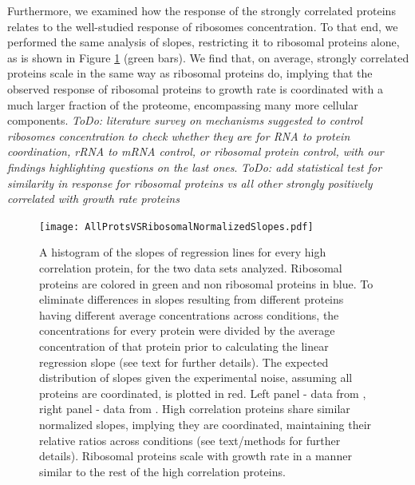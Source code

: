 \documentclass[notitlepage]{article}
\begin{document}
Furthermore, we examined how the response of the strongly correlated proteins relates to the well-studied response of ribosomes concentration.
To that end, we performed the same analysis of slopes, restricting it to ribosomal proteins alone, as is shown in Figure \ref{fig:globalfit} (green bars).
We find that, on average, strongly correlated proteins scale in the same way as ribosomal proteins do, implying that the observed response of ribosomal proteins to growth rate is coordinated with a much larger fraction of the proteome, encompassing many more cellular components.
\emph{ToDo: literature survey on mechanisms suggested to control ribosomes concentration to check whether they are for RNA to protein coordination, rRNA to mRNA control, or ribosomal protein control, with our findings highlighting questions on the last ones}.
\emph{ToDo: add statistical test for similarity in response for ribosomal proteins vs all other strongly positively correlated with growth rate proteins}

\begin{figure}[h]
\centering
\texttt{[image: AllProtsVSRibosomalNormalizedSlopes.pdf]}
\caption{
    A histogram of the slopes of regression lines for every high correlation protein, for the two data sets analyzed.
    Ribosomal proteins are colored in green and non ribosomal proteins in blue.
    To eliminate differences in slopes resulting from different proteins having different average concentrations across conditions, the concentrations for every protein were divided by the average concentration of that protein prior to calculating the linear regression slope (see text for further details).
    The expected distribution of slopes given the experimental noise, assuming all proteins are coordinated, is plotted in red.
    Left panel - data from \cite{Valgepea2013}, right panel - data from \cite{Heinemann2014}.
    High correlation proteins share similar normalized slopes, implying they are coordinated, maintaining their relative ratios across conditions (see text/methods for further details).
    Ribosomal proteins scale with growth rate in a manner similar to the rest of the high correlation proteins.
}
\label{fig:globalfit}
\end{figure}
\end{document}
